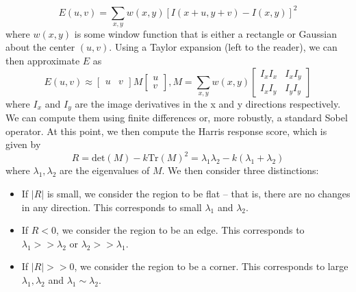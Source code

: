 \documentclass[a4paper, 12pt]{article}
\numberwithin{equation}{section}
\begin{document}
$$E(u,v) = \sum_{x,y}w(x,y)[I(x+u, y+v) - I(x,y)]^2$$
where $w(x,y)$ is some window function that is either a rectangle or Gaussian about the center $(u,v)$. Using a Taylor expansion (left to the reader), we can then approximate $E$ as 
$$E(u,v) \approx \begin{bmatrix} u & v\end{bmatrix}M \begin{bmatrix}u \\ v\end{bmatrix}, M = \sum_{x,y}w(x,y)\begin{bmatrix}I_xI_x & I_xI_y\\I_xI_y& I_yI_y\end{bmatrix}$$
where $I_x$ and $I_y$ are the image derivatives in the x and y directions respectively. We can compute them using finite differences or, more robustly, a standard Sobel operator. At this point, we then compute the Harris response score, which is given by 
$$R = \text{det}(M) - k\text{Tr}(M)^2 = \lambda_1\lambda_2 - k(\lambda_1+\lambda_2)$$
where $\lambda_1,\lambda_2$ are the eigenvalues of $M$. We then consider three distinctions:
\begin{itemize}
\item If $|R|$ is small, we consider the region to be flat -- that is, there are no changes in any direction. This corresponds to small $\lambda_1$ and $\lambda_2$.
\item If $R < 0$, we consider the region to be an edge. This corresponds to $\lambda_1 >> \lambda_2$ or $\lambda_2 >> \lambda_1$. 
\item If $|R| >> 0$, we consider the region to be a corner. This corresponds to large $\lambda_1,\lambda_2$ and $\lambda_1 \sim \lambda_2$.
\end{itemize}
\end{document}
